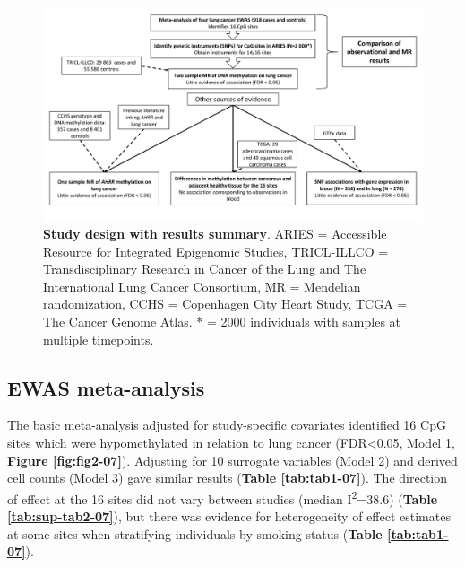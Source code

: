 \documentclass[11pt,oneside]{bristolthesis}
\newcommand{\blandscape}{\begin{landscape}}
\newcommand{\elandscape}{\end{landscape}}
\begin{document}
\blandscape
\begin{figure}[htbp]

{\centering \includegraphics[width=1\linewidth]{figure/07-dnam_lungcancer_mr/Figure_1} 

}

\caption[Study design with results summary]{\textbf{Study design with results summary}. ARIES = Accessible Resource for Integrated Epigenomic Studies, TRICL-ILLCO = Transdisciplinary Research in Cancer of the Lung and The International Lung Cancer Consortium, MR = Mendelian randomization, CCHS = Copenhagen City Heart Study, TCGA = The Cancer Genome Atlas. * = 2000 individuals with samples at multiple timepoints.}\label{fig:fig1-07}
\end{figure}
\elandscape

\hypertarget{results-ewas-meta-analysis}{%
\subsection{EWAS meta-analysis}\label{results-ewas-meta-analysis}}

The basic meta-analysis adjusted for study-specific covariates identified 16 CpG sites which were hypomethylated in relation to lung cancer (FDR\textless0.05, Model 1, \textbf{Figure \ref{fig:fig2-07}}). Adjusting for 10 surrogate variables (Model 2) and derived cell counts (Model 3) gave similar results (\textbf{Table \ref{tab:tab1-07}}). The direction of effect at the 16 sites did not vary between studies (median I\textsuperscript{2}=38.6) (\textbf{Table \ref{tab:sup-tab2-07}}), but there was evidence for heterogeneity of effect estimates at some sites when stratifying individuals by smoking status (\textbf{Table \ref{tab:tab1-07}}).
\end{document}
